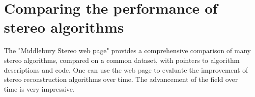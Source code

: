 \section{Comparing the performance of stereo algorithms}
The "Middlebury Stereo web page" \cite{Scharstein2002} provides a comprehensive comparison of many stereo algorithms, compared on a common dataset, with pointers to algorithm descriptions and code.  One can use the web page to evaluate the improvement of stereo reconstruction algorithms over time.  The advancement of the field over time is very impressive.



